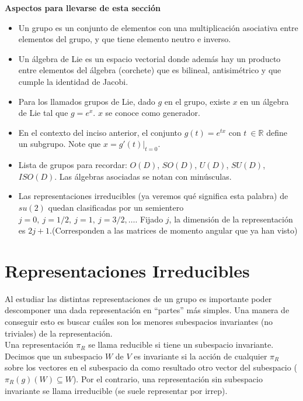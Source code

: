 \begin{cabox}
    \textbf{Aspectos para llevarse de esta sección}
    \renewcommand{\labelitemi}{\ding{42}}
    \begin{itemize}
        \item Un grupo es un conjunto de elementos con una multiplicación asociativa entre elementos del grupo, y que tiene elemento neutro e inverso.
        \item Un álgebra de Lie es un espacio vectorial donde además hay un producto entre elementos del álgebra (corchete) que es bilineal, antisimétrico y que cumple la identidad de Jacobi.
        \item Para los llamados grupos de Lie, dado $g$ en el grupo, existe $x$ en un álgebra de Lie tal que $g = e^{x}$. $x$ se conoce como generador.
        \item En el contexto del inciso anterior, el conjunto $g(t) = e^{tx}$ con $t~ \in \mathbb{R}$ define un subgrupo. Note que $x = g'(t)|_{t=0}$.
        \item Lista de grupos para recordar: $O(D)$, $SO(D)$, $U(D)$, $SU(D)$, $ISO(D)$. Las álgebras asociadas se notan con minúsculas.
        \item Las representaciones irreducibles (ya veremos qué significa esta palabra) de $su(2)$ quedan clasificadas por un semientero $j = 0,~ j=1/2,~ j=1,~ j=3/2,\ldots$. Fijado $j$, la dimensión de la representación es $2j + 1$.(Corresponden a las matrices de momento angular que ya han visto)
    \end{itemize}
\end{cabox}

 
\section{Representaciones Irreducibles}

Al estudiar las distintas representaciones de un grupo es importante poder descomponer una dada representación en ``partes'' más simples. Una manera de conseguir esto es buscar cuáles son los menores subespacios invariantes (no triviales) de la representación.\\

Una representación $\pi_{R}$ se llama reducible si tiene un subespacio invariante. Decimos que un subespacio $W$ de $V$ es invariante si la acción de cualquier $\pi_{R}$ sobre los vectores en el subespacio da como resultado otro vector del subespacio ($\pi_{R}(g)(W) \subseteq W$). Por el contrario, una representación sin subespacio invariante se llama irreducible (se suele representar por irrep).\\

